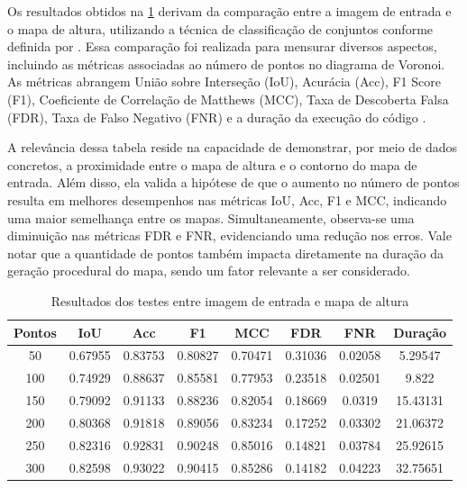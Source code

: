 Os resultados obtidos na \cref{tab:final_input_output_3d} derivam da comparação entre a imagem de entrada e o mapa de altura, utilizando a técnica de classificação de conjuntos conforme definida por \cite{kirillov2019panoptic}. Essa comparação foi realizada para mensurar diversos aspectos, incluindo as métricas associadas ao número de pontos no diagrama de Voronoi. As métricas abrangem União sobre Interseção (IoU), Acurácia (Acc), F1 Score (F1), Coeficiente de Correlação de Matthews (MCC), Taxa de Descoberta Falsa (FDR), Taxa de Falso Negativo (FNR) e a duração da execução do código \cite{Chicco2020, confusion_matrix_calculator, iou_metric_link}.

A relevância dessa tabela reside na capacidade de demonstrar, por meio de dados concretos, a proximidade entre o mapa de altura e o contorno do mapa de entrada. Além disso, ela valida a hipótese de que o aumento no número de pontos resulta em melhores desempenhos nas métricas IoU, Acc, F1 e MCC, indicando uma maior semelhança entre os mapas. Simultaneamente, observa-se uma diminuição nas métricas FDR e FNR, evidenciando uma redução nos erros. Vale notar que a quantidade de pontos também impacta diretamente na duração da geração procedural do mapa, sendo um fator relevante a ser considerado.

\begin{table}[h]
	\centering
	\caption{Resultados dos testes entre imagem de entrada e mapa de altura}
	\label{tab:final_input_output_3d}
	\begin{tabular}{|c|c|c|c|c|c|c|c|}
		\hline
						Pontos & IoU & Acc & F1 & MCC & FDR & FNR & Duração \\
		\hline
		50 & 0.67955 & 0.83753 & 0.80827 & 0.70471 & 0.31036 & 0.02058 & 5.29547\\
100 & 0.74929 & 0.88637 & 0.85581 & 0.77953 & 0.23518 & 0.02501 & 9.822\\
150 & 0.79092 & 0.91133 & 0.88236 & 0.82054 & 0.18669 & 0.0319 & 15.43131\\
200 & 0.80368 & 0.91818 & 0.89056 & 0.83234 & 0.17252 & 0.03302 & 21.06372\\
250 & 0.82316 & 0.92831 & 0.90248 & 0.85016 & 0.14821 & 0.03784 & 25.92615\\
300 & 0.82598 & 0.93022 & 0.90415 & 0.85286 & 0.14182 & 0.04223 & 32.75651\\
		\hline
	\end{tabular}
\end{table}

